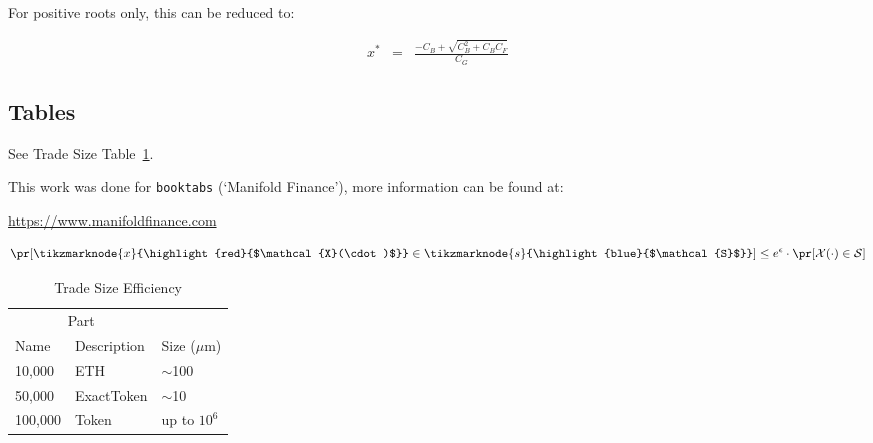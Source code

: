 \documentclass{article}
\begin{document}
	For positive roots only, this can be reduced to:
	
	\begin{eqnarray}
		x^* &=& \frac{- C_{B} + \sqrt{C_{B} ^2 + C_{B} C_{F}}}{C_{G}} \label{eqn:sol2}
	\end{eqnarray}
	
	
	\subsection{Tables}
	See Trade Size Table~\ref{tab:table}.
	
	This work was done for \verb+booktabs+ (`Manifold Finance'), more information can be found at:
	\begin{center}
		\url{https://www.manifoldfinance.com}
	\end{center}
	
	
\begin{equation}
    \vspace{\baselineskip}
            \label{eq:epsilon}
                \pr[\tikzmarknode{x}{\highlight{red}{$\mathcal{X}(\cdot)$}}\in \tikzmarknode{s}{\highlight{blue}{$\mathcal{S}$}}] \leq e^\epsilon \cdot \pr[\mathcal{X}(\cdot)\in \mathcal{S}]
\end{equation}

	
	
	\begin{table}
		\caption{Trade Size Efficiency}
		\centering
		\begin{tabular}{lll}
			\toprule
			\multicolumn{2}{c}{Part}                   \\
			\cmidrule(r){1-2}
			Name     & Description     & Size ($\mu$m) \\
			\midrule
			10,000 & ETH  & $\sim$100     \\
			50,000     & ExactToken & $\sim$10      \\
			100,000     & Token       & up to $10^6$  \\
			\bottomrule
		\end{tabular}
		\label{tab:table}
	\end{table}
	
\end{document}
